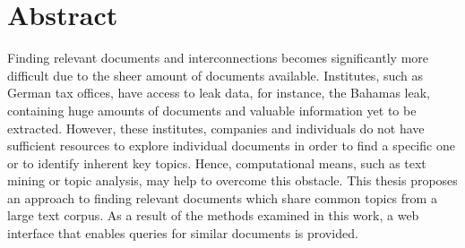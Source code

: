\chapter*{Abstract}

Finding relevant documents and interconnections becomes significantly more difficult due to the sheer amount of documents available.
Institutes, such as German tax offices, have access to leak data, for instance, the Bahamas leak, 
containing huge amounts of documents and valuable information yet to be extracted.
However, these institutes, companies and individuals do not have sufficient resources to explore individual documents 
in order to find a specific one or to identify inherent key topics.
Hence, computational means, such as text mining or topic analysis, may help to overcome this obstacle.
This thesis proposes an approach to finding relevant documents which share common topics from a large text corpus.
As a result of the methods examined in this work, a web interface that enables queries for similar documents is provided. 